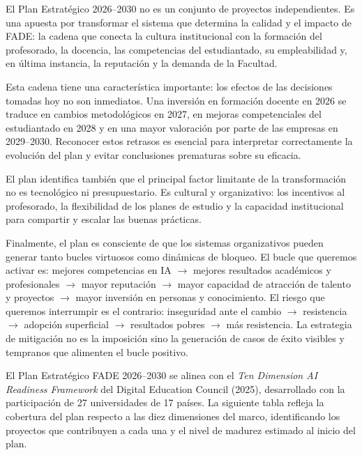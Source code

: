 \documentclass[11pt,a4paper]{scrreprt}
\begin{document}

\small
El Plan Estratégico 2026--2030 no es un conjunto de proyectos independientes. Es una apuesta por transformar el sistema que determina la calidad y el impacto de FADE: la cadena que conecta la cultura institucional con la formación del profesorado, la docencia, las competencias del estudiantado, su empleabilidad y, en última instancia, la reputación y la demanda de la Facultad.

Esta cadena tiene una característica importante: los efectos de las decisiones tomadas hoy no son inmediatos. Una inversión en formación docente en 2026 se traduce en cambios metodológicos en 2027, en mejoras competenciales del estudiantado en 2028 y en una mayor valoración por parte de las empresas en 2029--2030. Reconocer estos retrasos es esencial para interpretar correctamente la evolución del plan y evitar conclusiones prematuras sobre su eficacia.

El plan identifica también que el principal factor limitante de la transformación no es tecnológico ni presupuestario. Es cultural y organizativo: los incentivos al profesorado, la flexibilidad de los planes de estudio y la capacidad institucional para compartir y escalar las buenas prácticas. 

Finalmente, el plan es consciente de que los sistemas organizativos pueden generar tanto bucles virtuosos como dinámicas de bloqueo. El bucle que queremos activar es: mejores competencias en IA $\rightarrow$ mejores resultados académicos y profesionales $\rightarrow$ mayor reputación $\rightarrow$ mayor capacidad 
de atracción de talento y proyectos $\rightarrow$ mayor inversión en personas y conocimiento. El riesgo que queremos interrumpir es el contrario: inseguridad ante el cambio $\rightarrow$ resistencia $\rightarrow$ adopción superficial $\rightarrow$ resultados pobres $\rightarrow$ más resistencia. La estrategia de mitigación no es la imposición sino la generación de casos de éxito visibles y tempranos que alimenten el bucle positivo.


\small
El Plan Estratégico FADE 2026--2030 se alinea con el \textit{Ten Dimension AI Readiness Framework} del Digital Education Council (2025), desarrollado con la participación de 27 universidades de 17 países. La siguiente tabla refleja la cobertura del plan respecto a las diez dimensiones del marco, identificando los proyectos que contribuyen a cada una y el nivel de madurez estimado al inicio del plan.
\end{document}

